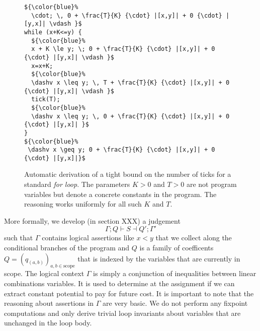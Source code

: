 \documentclass[nocopyrightspace,preprint]{sigplanconf}
\begin{document}
\begin{figure}[t]
  \centering
\begin{lstlisting}[mathescape]
${\color{blue}%
  \cdot; \, 0 + \frac{T}{K} {\cdot} |[x,y]| + 0 {\cdot} |[y,x]| \vdash }$
while (x+K<=y) {
  ${\color{blue}%
  x + K \le y; \; 0 + \frac{T}{K} {\cdot} |[x,y]| + 0 {\cdot} |[y,x]| \vdash }$
  x=x+K; 
  ${\color{blue}%
  \dashv x \leq y; \, T + \frac{T}{K} {\cdot} |[x,y]| + 0 {\cdot} |[y,x]| \vdash }$
  tick(T);
  ${\color{blue}%
  \dashv x \leq y; \, 0 + \frac{T}{K} {\cdot} |[x,y]| + 0 {\cdot} |[y,x]| }$
}
${\color{blue}%
 \dashv x \geq y; 0 + \frac{T}{K} {\cdot} |[x,y]| + 0 {\cdot} |[y,x]|}$
\end{lstlisting}
  \caption{Automatic derivation of a tight bound on the number of
    ticks for a standard \emph{for loop}.  The parameters $K>0$ and
    $T>0$ are not program variables but denote a concrete constants in
    the program.  The reasoning works uniformly for all such $K$ and
    $T$.}
  \label{fig:ex1}
\end{figure}
More formally, we develop (in section XXX) a judgement 
$$
\Gamma; Q \vdash S \dashv Q'; \Gamma'
$$
such that $\Gamma$ contains logical assertions like $x<y$ that we
collect along the conditional branches of the program and $Q$ is a
family of coefficents $Q = (q_{(a,b)})_{a,b \in \text{scope}}$ that is
indexed by the variables that are currently in scope.  The logical
context $\Gamma$ is simply a conjunction of inequalities between
linear combinations variables.  It is used to determine at the
assignment if we can extract constant potential to pay for future
cost.  It is important to note that the reasoning about assertions in
$\Gamma$ are very basic.  We do not perform any fixpoint computations
and only derive trivial loop invariants about variables that are
unchanged in the loop body.
\end{document}
